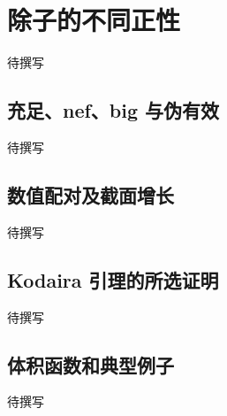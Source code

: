 
% 
% 

\section{除子的不同正性}
\label{g5:sec:3001}

待撰写

\subsection{充足、nef、big 与伪有效}
\label{g5:subsec:3001:01}
待撰写

\subsection{数值配对及截面增长}
\label{g5:subsec:3001:02}
待撰写

\subsection{Kodaira 引理的所选证明}
\label{g5:subsec:3001:03}
待撰写

\subsection{体积函数和典型例子}
\label{g5:subsec:3001:04}
待撰写
